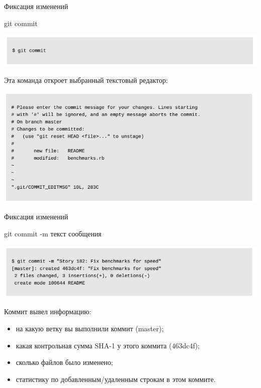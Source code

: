 \documentclass{beamer}
\begin{document}
\begin{frame}{Фиксация изменений}
\begin{block}{git commit}
\begin{center}
\includegraphics[scale=0.5]{images/commit.png}
\end{center}
\end{block}
Эта команда откроет выбранный текстовый редактор:
\begin{center}
\includegraphics[scale=0.5]{images/commit-1.png}
\end{center} 
\end{frame}

\begin{frame}{Фиксация изменений}
\begin{block}{git commit -m текст сообщения}
\begin{center}
\includegraphics[scale=0.5]{images/commit-2.png}
\end{center}
Коммит вывел информацию:
\begin{itemize}
\item на какую ветку вы выполнили коммит (master);
\item какая контрольная сумма SHA-1 у этого коммита (463dc4f);
\item сколько файлов было изменено;
\item статистику по добавленным/удаленным строкам в этом коммите.
\end{itemize}
\end{block}
\end{frame}
\end{document}
